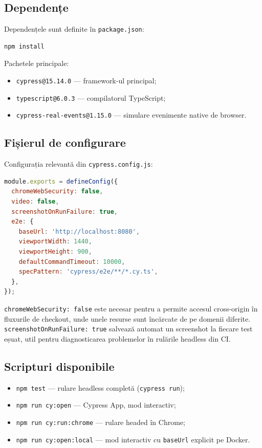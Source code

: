 \subsection{Dependențe}

Dependențele sunt definite în \texttt{package.json}:

\begin{lstlisting}[language=bash, caption={Instalare dependențe Cypress}]
npm install
\end{lstlisting}

Pachetele principale:

\begin{itemize}
    \item \texttt{cypress@15.14.0} --- framework-ul principal;
    \item \texttt{typescript@6.0.3} --- compilatorul TypeScript;
    \item \texttt{cypress-real-events@1.15.0} --- simulare evenimente native de browser.
\end{itemize}

\subsection{Fișierul de configurare}

Configurația relevantă din \texttt{cypress.config.js}:

\begin{lstlisting}[language=JavaScript, caption={cypress.config.js}]
module.exports = defineConfig({
  chromeWebSecurity: false,
  video: false,
  screenshotOnRunFailure: true,
  e2e: {
    baseUrl: 'http://localhost:8080',
    viewportWidth: 1440,
    viewportHeight: 900,
    defaultCommandTimeout: 10000,
    specPattern: 'cypress/e2e/**/*.cy.ts',
  },
});
\end{lstlisting}

\texttt{chromeWebSecurity: false} este necesar pentru a permite accesul cross-origin în
fluxurile de checkout, unde unele resurse sunt încărcate de pe domenii diferite.
\texttt{screenshotOnRunFailure: true} salvează automat un screenshot la fiecare test eșuat,
util pentru diagnosticarea problemelor în rulările headless din CI.

\subsection{Scripturi disponibile}

\begin{itemize}
    \item \texttt{npm test} --- rulare headless completă (\texttt{cypress run});
    \item \texttt{npm run cy:open} --- Cypress App, mod interactiv;
    \item \texttt{npm run cy:run:chrome} --- rulare headed în Chrome;
    \item \texttt{npm run cy:open:local} --- mod interactiv cu \texttt{baseUrl} explicit pe Docker.
\end{itemize}

